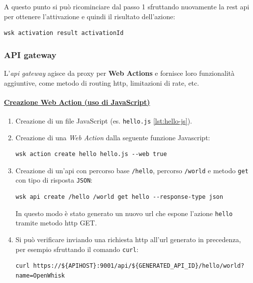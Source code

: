 \documentclass[12pt,a4paper,openany,twoside]{book}
\begin{document}
\begin{enumerate}
    

    A questo punto si può ricominciare dal passo 1 sfruttando nuovamente la \ac{rest} \ac{api} per ottenere l'attivazione e quindi il risultato dell'azione:
    \begin{lstlisting}
wsk activation result activationId\end{lstlisting}
\end{enumerate}

\subsubsection{API gateway}

L'\textit{\ac{api} gateway} agisce da proxy per \textbf{Web Actions} e fornisce loro funzionalità aggiuntive, come metodo di routing \ac{http}, limitazioni di rate, etc.

\paragraph{\underline{Creazione Web Action (uso di JavaScript)}}
\begin{enumerate}
    \item Creazione di un file JavaScript (es. \texttt{hello.js} \cref{lst:hello-js}).

    
    
    \item Creazione di una \textit{Web Action} dalla seguente funzione Javascript:
    \begin{lstlisting}
wsk action create hello hello.js --web true\end{lstlisting}

    \item Creazione di un'\ac{api} con percorso base \texttt{/hello}, percorso \texttt{/world} e metodo \texttt{get} con tipo di risposta \texttt{JSON}:
    \begin{lstlisting}
wsk api create /hello /world get hello --response-type json\end{lstlisting}

    In questo modo è stato generato un nuovo \ac{url} che espone l'azione \texttt{hello} tramite metodo \ac{http} GET.
    
    \item Si può verificare inviando una richiesta \ac{http} all'\ac{url} generato in precedenza, per esempio sfruttando il comando \texttt{curl}:
    \begin{lstlisting}
curl https://${APIHOST}:9001/api/${GENERATED_API_ID}/hello/world?name=OpenWhisk\end{lstlisting}
\end{enumerate}
\end{document}
